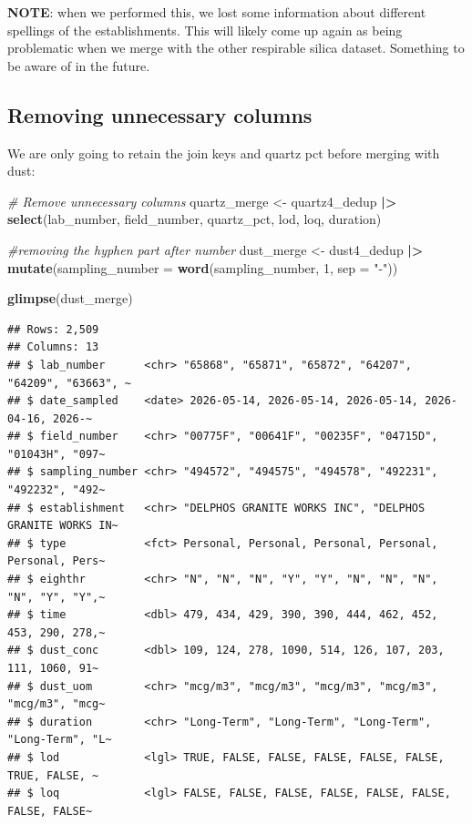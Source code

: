 \documentclass[
]{article}
\newenvironment{Shaded}{\begin{snugshade}}{\end{snugshade}}
\newcommand{\AttributeTok}[1]{\textcolor[rgb]{0.13,0.29,0.53}{#1}}
\newcommand{\CommentTok}[1]{\textcolor[rgb]{0.56,0.35,0.01}{\textit{#1}}}
\newcommand{\DecValTok}[1]{\textcolor[rgb]{0.00,0.00,0.81}{#1}}
\newcommand{\FunctionTok}[1]{\textcolor[rgb]{0.13,0.29,0.53}{\textbf{#1}}}
\newcommand{\NormalTok}[1]{#1}
\newcommand{\OtherTok}[1]{\textcolor[rgb]{0.56,0.35,0.01}{#1}}
\newcommand{\SpecialCharTok}[1]{\textcolor[rgb]{0.81,0.36,0.00}{\textbf{#1}}}
\newcommand{\StringTok}[1]{\textcolor[rgb]{0.31,0.60,0.02}{#1}}
\begin{document}
\textbf{NOTE}: when we performed this, we lost some information about
different spellings of the establishments. This will likely come up
again as being problematic when we merge with the other respirable
silica dataset. Something to be aware of in the future.

\subsection{Removing unnecessary
columns}\label{removing-unnecessary-columns}

We are only going to retain the join keys and quartz pct before merging
with dust:

\begin{Shaded}
\begin{Highlighting}[]
\CommentTok{\# Remove unnecessary columns}
\NormalTok{quartz\_merge }\OtherTok{\textless{}{-}}\NormalTok{ quartz4\_dedup }\SpecialCharTok{|\textgreater{}} 
  \FunctionTok{select}\NormalTok{(lab\_number, field\_number, quartz\_pct, lod, loq, duration)}

\CommentTok{\#removing the hyphen part after number}
\NormalTok{dust\_merge }\OtherTok{\textless{}{-}}\NormalTok{ dust4\_dedup }\SpecialCharTok{|\textgreater{}} 
  \FunctionTok{mutate}\NormalTok{(}\AttributeTok{sampling\_number =} \FunctionTok{word}\NormalTok{(sampling\_number, }\DecValTok{1}\NormalTok{, }\AttributeTok{sep =} \StringTok{"{-}"}\NormalTok{))  }

\FunctionTok{glimpse}\NormalTok{(dust\_merge) }
\end{Highlighting}
\end{Shaded}

\begin{verbatim}
## Rows: 2,509
## Columns: 13
## $ lab_number      <chr> "65868", "65871", "65872", "64207", "64209", "63663", ~
## $ date_sampled    <date> 2026-05-14, 2026-05-14, 2026-05-14, 2026-04-16, 2026-~
## $ field_number    <chr> "00775F", "00641F", "00235F", "04715D", "01043H", "097~
## $ sampling_number <chr> "494572", "494575", "494578", "492231", "492232", "492~
## $ establishment   <chr> "DELPHOS GRANITE WORKS INC", "DELPHOS GRANITE WORKS IN~
## $ type            <fct> Personal, Personal, Personal, Personal, Personal, Pers~
## $ eighthr         <chr> "N", "N", "N", "Y", "Y", "N", "N", "N", "N", "Y", "Y",~
## $ time            <dbl> 479, 434, 429, 390, 390, 444, 462, 452, 453, 290, 278,~
## $ dust_conc       <dbl> 109, 124, 278, 1090, 514, 126, 107, 203, 111, 1060, 91~
## $ dust_uom        <chr> "mcg/m3", "mcg/m3", "mcg/m3", "mcg/m3", "mcg/m3", "mcg~
## $ duration        <chr> "Long-Term", "Long-Term", "Long-Term", "Long-Term", "L~
## $ lod             <lgl> TRUE, FALSE, FALSE, FALSE, FALSE, FALSE, TRUE, FALSE, ~
## $ loq             <lgl> FALSE, FALSE, FALSE, FALSE, FALSE, FALSE, FALSE, FALSE~
\end{verbatim}
\end{document}
